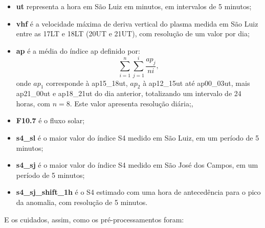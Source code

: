 \begin{itemize}
\item {\bf ut} representa a hora em São Luiz em minutos, em intervalos de 5 minutos;
\item {\bf vhf} é a velocidade máxima de deriva vertical do plasma medida em São Luiz entre as 17LT e 18LT (20UT e 21UT), com resolução de um valor por dia;
\item {\bf ap} é a média do índice ap definido por:
\begin{equation}
\sum_{i=1}^{n}\sum_{j=1}^{i}\frac{ap_{j}}{ni}\mbox{,}~
\end{equation}
onde $ap_1$ corresponde à ap15\_18ut, $ap_2$ à ap12\_15ut até ap00\_03ut, mais ap21\_00ut e ap18\_21ut do dia anterior, totalizando um intervalo de 24 horas, com $n=8$. Este valor apresenta resolução diária;,
\item {\bf F10.7} é o fluxo solar;
\item {\bf s4\_sl} é o maior valor do índice S4 medido em São Luiz, em um período de 5 minutos;
\item {\bf s4\_sj} é o maior valor do índice S4 medido em São José dos Campos, em um período de 5 minutos;
\item {\bf s4\_sj\_shift\_1h} é o S4 estimado com uma hora de antecedência para o pico da anomalia, com resolução de 5 minutos.
\end{itemize}

E os cuidados, assim, como os pré-processamentos foram:

